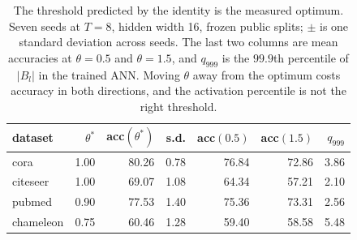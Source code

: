 \begin{table}[t]
\centering
\footnotesize
\caption{The threshold predicted by the identity is the measured optimum. Seven seeds at
$T=8$, hidden width 16, frozen public splits; $\pm$ is one standard deviation across
seeds. The last two columns are mean accuracies at $\theta=0.5$ and $\theta=1.5$, and
$q_{999}$ is the $99.9$th percentile of $|B_l|$ in the trained ANN. Moving $\theta$ away
from the optimum costs accuracy in both directions, and the activation percentile is not
the right threshold.}\label{tab:threshold}
\begin{tabular}{lrrrrrr}
\toprule
dataset & $\theta^*$ & acc$(\theta^*)$ & s.d. & acc$(0.5)$ & acc$(1.5)$ & $q_{999}$ \\
\midrule
cora & 1.00 & 80.26 & 0.78 & 76.84 & 72.86 & 3.86 \\
citeseer & 1.00 & 69.07 & 1.08 & 64.34 & 57.21 & 2.10 \\
pubmed & 0.90 & 77.53 & 1.40 & 75.36 & 73.31 & 2.56 \\
chameleon & 0.75 & 60.46 & 1.28 & 59.40 & 58.58 & 5.48 \\
\bottomrule
\end{tabular}
\end{table}
